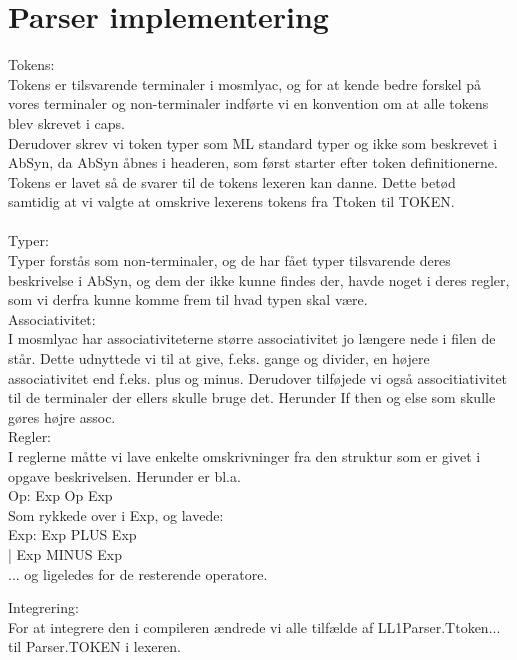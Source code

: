 \documentclass[11pt,a4paper]{article}
\begin{document}
\section*{Parser implementering}
\label{sec:implementation}
Tokens:\\
Tokens er tilsvarende terminaler i mosmlyac, og for at kende bedre forskel på vores terminaler og non-terminaler indførte vi en konvention om at alle tokens blev skrevet i caps.\\
Derudover skrev vi token typer som ML standard typer og ikke som beskrevet i AbSyn, da AbSyn åbnes i headeren, som først starter efter token definitionerne.\\
Tokens er lavet så de svarer til de tokens lexeren kan danne. Dette betød samtidig at vi valgte at omskrive lexerens tokens fra Ttoken til TOKEN.\\
\\
Typer:\\
Typer forstås som non-terminaler, og de har fået typer tilsvarende deres beskrivelse i AbSyn, og dem der ikke kunne findes der, havde noget i deres regler, som vi derfra kunne komme frem til hvad typen skal være.
\\
Associativitet:\\
I mosmlyac har associativiteterne større associativitet jo længere nede i filen de står. Dette udnyttede vi til at give, f.eks. gange og divider, en højere associativitet end f.eks. plus og minus. Derudover tilføjede vi også associtiativitet til de terminaler der ellers skulle bruge det. Herunder If then og else som skulle gøres højre assoc.\\
Regler:\\
I reglerne måtte vi lave enkelte omskrivninger fra den struktur som er givet i opgave beskrivelsen. Herunder er bl.a. \\
Op: Exp Op Exp\\
Som rykkede over i Exp, og lavede:\\
Exp: Exp PLUS Exp\\
   | Exp MINUS Exp\\
... og ligeledes for de resterende operatore.

Integrering:\\
For at integrere den i compileren ændrede vi alle tilfælde af LL1Parser.Ttoken... til Parser.TOKEN i lexeren.
\end{document}
